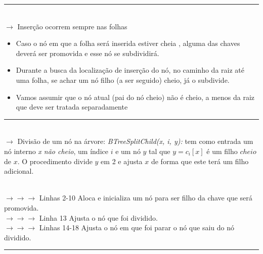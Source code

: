 \documentclass[a4paper, 12pt]{article}
\begin{document}
\rule{12cm}{0.4pt}\\

$\rightarrow$ Inserção ocorrem sempre nas folhas

\begin{itemize}
\item Caso o nó em que a folha será inserida estiver cheia , alguma das chaves deverá ser promovida e esse nó se subdividirá.
\item Durante a busca da localização de inserção do nó, no caminho da raiz até uma folha, se achar um nó filho (a ser seguido) cheio, já o subdivide.
\item Vamos assumir que o nó atual (pai do nó cheio) não é cheio, a menos da raiz que deve ser tratada separadamente
\end{itemize}



\rule{12cm}{0.4pt}\\

$\rightarrow$ Divisão de um nó na árvore: \textit{BTreeSplitChild(x, i, y):} tem como entrada um nó interno \textit{x não cheio}, um índice $i$ e um nó $y$ tal que $y = c_{i}[x]$ é um filho $cheio$ de $x$. O procedimento divide $y$ em 2 e ajusta $x$ de forma que este terá um filho adicional.\\

\begin{algorithmic}[1]
\EndFor
{}
	\EndFor
\EndIf
{}
\EndFor
{}
\end{algorithmic}
\textcolor{white}{               }\\
$\rightarrow \rightarrow \rightarrow$ Linhas 2-10 Aloca e inicializa um nó para ser filho da chave que será promovida.\\
$\rightarrow \rightarrow \rightarrow$ Linha 13 Ajusta o nó que foi dividido.\\
$\rightarrow \rightarrow \rightarrow$ Linhas 14-18 Ajusta o nó em que foi parar o nó que saiu do nó dividido.

\rule{12cm}{0.4pt}\\
\end{document}
